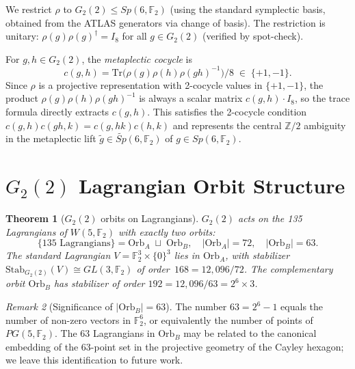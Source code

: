 \documentclass[11pt,a4paper]{article}
\newtheorem{theorem}{Theorem}[section]
\theoremstyle{remark}
\newtheorem{remark}[theorem]{Remark}
\newcommand{\wtSp}{\widetilde{Sp}}
\begin{document}
We restrict $\rho$ to $G_2(2) \leq Sp(6,\mathbb{F}_2)$ (using the standard
symplectic basis, obtained from the ATLAS generators via change of basis).
The restriction is unitary: $\rho(g)\rho(g)^\dagger = I_8$ for all
$g \in G_2(2)$ (verified by spot-check).

For $g, h \in G_2(2)$, the \emph{metaplectic cocycle} is
\[
  c(g, h) = \mathrm{Tr}\bigl(\rho(g)\rho(h)\rho(gh)^{-1}\bigr)/8 \;\in\; \{+1, -1\}.
\]
Since $\rho$ is a projective representation with 2-cocycle values in $\{+1,-1\}$,
the product $\rho(g)\rho(h)\rho(gh)^{-1}$ is always a scalar matrix
$c(g,h)\cdot I_8$, so the trace formula directly extracts $c(g,h)$.
This satisfies the 2-cocycle condition $c(g,h)c(gh,k) = c(g,hk)c(h,k)$
and represents the central $\mathbb{Z}/2$ ambiguity in the metaplectic lift
$\tilde{g} \in \wtSp(6,\mathbb{F}_2)$ of $g \in Sp(6,\mathbb{F}_2)$.


\section{\texorpdfstring{$G_2(2)$ Lagrangian Orbit Structure}{G2(2) Lagrangian Orbit Structure}}\label{sec:lagorbits}

\begin{theorem}[$G_2(2)$ orbits on Lagrangians]\label{thm:lagorbits}
$G_2(2)$ acts on the 135 Lagrangians of $W(5,\mathbb{F}_2)$ with exactly two orbits:
\[
  \{\text{135 Lagrangians}\} = \mathrm{Orb}_A \;\sqcup\; \mathrm{Orb}_B,
  \quad |\mathrm{Orb}_A| = 72, \quad |\mathrm{Orb}_B| = 63.
\]
The standard Lagrangian $V = \mathbb{F}_2^3 \times \{0\}^3$ lies in $\mathrm{Orb}_A$,
with stabilizer
$\mathrm{Stab}_{G_2(2)}(V) \cong GL(3,\mathbb{F}_2)$ of order~$168 = 12{,}096/72$.
The complementary orbit $\mathrm{Orb}_B$ has stabilizer of order
$192 = 12{,}096/63 = 2^6 \times 3$.
\end{theorem}

\begin{remark}[Significance of $|\mathrm{Orb}_B| = 63$]
The number $63 = 2^6 - 1$ equals the number of non-zero vectors in $\mathbb{F}_2^6$,
or equivalently the number of points of $PG(5,\mathbb{F}_2)$.
The 63 Lagrangians in $\mathrm{Orb}_B$ may be related to the canonical
embedding of the 63-point set in the projective geometry of the Cayley hexagon;
we leave this identification to future work.
\end{remark}
\end{document}

